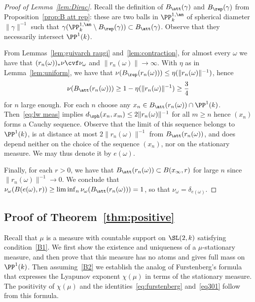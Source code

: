 \begin{proof}[Proof of Lemma~\ref{lem:Dirac}]
Recall the definition of $B_\att(\gamma)$ and $B_\rep(\gamma)$ from Proposition~\ref{prop:B att rep}: these are two balls in $\PP^{1,\an}_k$ of spherical diameter $\|\gamma\|^{-1}$ such that $\gamma (\PP^{1,\an}_k \setminus B_\rep(\gamma)) \subset B_\att(\gamma)$. Observe that they necessarily intersect $\PP^1(k)$.

From Lemmas~\ref{lem:guivarch raugi} and~\ref{lem:contraction}, for almost every $\omega$ we have that $(r_n(\omega))_*\nu\cvf\nu_\omega$ and $\| r_n(\omega)\| \to \infty$. With $\eta$ as in Lemma~\ref{lem:uniform}, we have that $\nu (B_{\rep}(r_n(\omega)))\leq \eta (\| r_n(\omega)\|^{-1})$, hence
\begin{equation}\label{eq:lw meas}
\nu (B_{\att}(r_n(\omega)))\geq 1- \eta (\| r_n(\omega)\|^{-1}) \ge \frac34
\end{equation}
for $n$ large enough. For each $n$ choose any $x_n \in B_{\att}(r_n(\omega)) \cap \PP^1(k)$. Then~\eqref{eq:lw meas} implies $d_{\sph}(x_n,x_m) \le 2\|r_n(\omega)\|^{-1}$ for all $m\ge n$ hence $(x_n)$ forms a Cauchy sequence. Observe that the limit of this sequence belongs to $\PP^1(k)$, is at distance at most $2\|r_n(\omega)\|^{-1}$ from $B_\att(r_n(\omega))$, and does depend neither on the choice of the sequence $(x_n)$, nor on the stationary measure. We may thus denote it by $e(\omega)$.

Finally, for each $r>0$, we have that $B_{\att}(r_n(\omega)) \subset B(x_\infty,r)$ for large $n$ since $\|r_n(\omega)\|^{-1} \to0$. We conclude that $\nu_\omega(B(e(\omega),r)) \ge \liminf_n \nu_\omega(B_{\att}(r_n(\omega))) =1$, so that $\nu_\omega = \delta_{e(\omega)}$.
\end{proof}

\subsection{Proof of Theorem~\ref{thm:positive}}

Recall that $\mu$ is a measure with countable support on $\SL(2,k)$ satisfying condition~\eqref{B1}. We first show the existence and uniqueness of a $\mu$-stationary measure, and then prove that this measure has no atoms and gives full mass on $\PP^1(k)$. Then assuming~\eqref{B2} we establish the analog of Furstenberg's formula that expresses the Lyapunov exponent $\chi(\mu)$ in terms of the stationary measure. The positivity of $\chi(\mu)$ and the identities~\eqref{eq:furstenberg} and~\eqref{eq301} follow from this formula.

